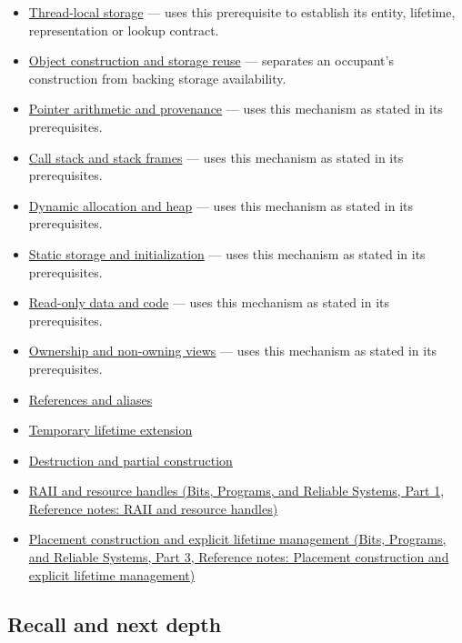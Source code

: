 \begin{itemize}
\tightlist
\item
  \hyperref[appendix-3b88c6cd7195]{Thread-local storage} --- uses this prerequisite to establish its entity, lifetime, representation or lookup contract.
\item
  \hyperref[appendix-a82f9c438857]{Object construction and storage reuse} --- separates an occupant's construction from backing storage availability.
\item
  \hyperref[appendix-6af5921bc853]{Pointer arithmetic and provenance} --- uses this mechanism as stated in its prerequisites.
\item
  \hyperref[appendix-b081b7abe193]{Call stack and stack frames} --- uses this mechanism as stated in its prerequisites.
\item
  \hyperref[appendix-c3480f7d9ff3]{Dynamic allocation and heap} --- uses this mechanism as stated in its prerequisites.
\item
  \hyperref[appendix-17c93c4c2f19]{Static storage and initialization} --- uses this mechanism as stated in its prerequisites.
\item
  \hyperref[appendix-5f9e5e2f0a5e]{Read-only data and code} --- uses this mechanism as stated in its prerequisites.
\item
  \hyperref[appendix-d52e4486f527]{Ownership and non-owning views} --- uses this mechanism as stated in its prerequisites.
\item
  \hyperref[appendix-d6d562ca9fbb]{References and aliases}
\item
  \hyperref[appendix-a978b29bbbb0]{Temporary lifetime extension}
\item
  \hyperref[appendix-9bfe377cef7a]{Destruction and partial construction}
\item
  \href{../01-Bits-Programs-and-Reliable-Systems-P01/main.pdf\#appendix-69739d3ab49b}{RAII and resource handles (Bits, Programs, and Reliable Systems, Part 1, Reference notes: RAII and resource handles)}
\item
  \href{../01-Bits-Programs-and-Reliable-Systems-P03/main.pdf\#appendix-f56c3e43fd4e}{Placement construction and explicit lifetime management (Bits, Programs, and Reliable Systems, Part 3, Reference notes: Placement construction and explicit lifetime management)}
\end{itemize}

\subsection{Recall and next depth}\label{appendix-0b104bcba06b-recall-and-next-depth}

